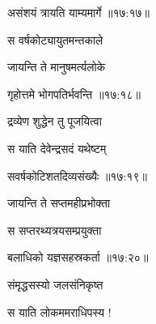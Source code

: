 {\devanagarifontbold असंशयं त्रायति याम्यमार्गे {॥१७:१७॥} \veg\dontdisplaylinenum }%
 
\ujvers{}

\nemslokab

{\devanagarifontbold स वर्षकोट्यायुतमन्तकाले  \danda\dontdisplaylinenum }%
 
\nemslokac

{\devanagarifontbold जायन्ति ते मानुषमर्त्यलोके }%
  \dontdisplaylinenum

\nemslokad

{\devanagarifontbold गृहोत्तमे भोगपतिर्भवन्ति {॥१७:१८॥} \veg\dontdisplaylinenum }%
 
\ujvers{}

\nemslokab

{\devanagarifontbold द्रव्येण शुद्धेन तु पूजयित्वा  \danda\dontdisplaylinenum }%
 
\nemslokac

{\devanagarifontbold स याति देवेन्द्रसदं यथेष्टम् }%
  \dontdisplaylinenum

\nemslokad

{\devanagarifontbold सवर्षकोटिशतदिव्यसंख्यैः {॥१७:१९॥} \veg\dontdisplaylinenum }%
 
\ujvers{}

\nemslokab

{\devanagarifontbold जायन्ति ते सप्तमहीप्रभोक्ता  \danda\dontdisplaylinenum }%
 
\nemslokac

{\devanagarifontbold स सप्तरथ्यत्रयसम्प्रयुक्ता }%
  \dontdisplaylinenum

\nemslokad

{\devanagarifontbold बलाधिको यज्ञसहस्रकर्ता {॥१७:२०॥} \veg\dontdisplaylinenum }%
 

 
\ujvers{}

\nemslokab

{\devanagarifontbold संमृद्धसस्यो जलसंनिकृष्त  \danda\dontdisplaylinenum }%
 
\nemslokac

{\devanagarifontbold स याति लोकममराधिपस्य ! }%
  \dontdisplaylinenum

